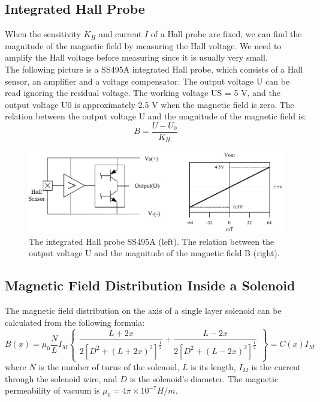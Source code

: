 \documentclass[12pt, a4paper]{article}
\begin{document}
\subsection{Integrated Hall Probe}
When the sensitivity $K_H$ and current $I$ of a Hall probe are fixed, 
we can find the magnitude of the magnetic field by measuring the Hall 
voltage. We need to amplify the Hall voltage before measuring since it is usually very small.
\\ \newline
The following picture is a SS495A integrated Hall probe, which consists of a Hall sensor, an amplifier and a voltage compensator. 
The output voltage U can be read ignoring the residual voltage. The working voltage US = 5 V, and the output voltage U0 is 
approximately 2.5 V when the magnetic field is zero. The relation between the output voltage U and the magnitude
of the magnetic field is:
\begin{equation}
	B = \frac{U-U_0}{K_H}
\end{equation}
\begin{figure}[H]
	\centering
	\includegraphics[scale = 0.6]{p2.png}
	\caption{The integrated Hall probe SS495A (left). The relation between the output
	voltage U and the magnitude of the magnetic field B (right).}
\end{figure}

\subsection{Magnetic Field Distribution Inside a Solenoid}
The magnetic field distribution on the axis of a single layer solenoid can be calculated
from the following formula:
\begin{equation}
	B(x)=\mu_0\dfrac{N}{L}I_M\begin{Bmatrix}
		\dfrac{L+2x}{2[D^2+(L+2x)^2]^{\frac{1}{2}}}+\dfrac{L-2x}{2[D^2+(L-2x)^2]^{\frac{1}{2}}}
		\end{Bmatrix}=C(x)I_M
\end{equation}
where $N$ is the number of turns of the solenoid, $L$ is its length, $I_M$ is the current through
the solenoid wire, and $D$ is the solenoid’s diameter. The magnetic permeability of vacuum
is $\mu_0 = 4\pi \times 10^{-7} H/m$.
\end{document}

